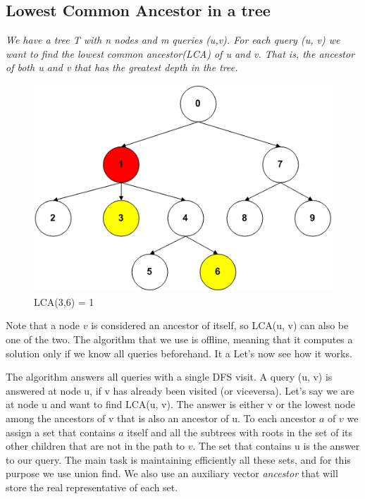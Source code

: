 \documentclass{article}
\begin{document}

\subsection{Lowest Common Ancestor in a tree}
\emph{We have a tree T with  n nodes and m queries (u,v). For each query (u, v) we want to find
the lowest common ancestor(LCA) of u and v. That is, the ancestor of both u and v that has the greatest depth in the tree.
}
\begin{figure}[h!]
    \centering
    \includegraphics[scale = 0.5]{img/lca1.png}
    \caption{LCA(3,6) = 1}
\end{figure}

 \bigskip
 Note that a node $v$ is considered an ancestor of itself, so LCA(u, v) can also be one of the two.
 The algorithm that we use is offline, meaning that it computes a solution only if we know
 all queries beforehand. It a Let's now see how it works. 
 
 \medskip
 The algorithm answers all queries
 with a single DFS visit. A query (u, v) is answered at node u, if v has already been visited
 (or viceversa). Let's say we are at node u and want to find LCA(u, v). The answer is either v or the lowest node among
the ancestors of v that is also an ancestor of u. To each ancestor $a$  of $v$ we assign a set
that contains $a$ itself and all the subtrees with roots in the set of its other children
that are not in the path to $v$. The set that contains u is the answer to our query. The main task is maintaining
efficiently all these sets, and for this purpose we use union find. We also use an auxiliary vector \emph{ancestor} that
will store the real representative of each set.
\end{document}
